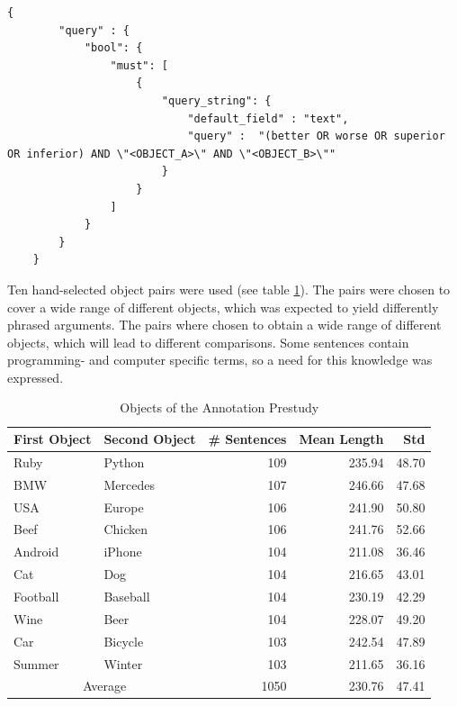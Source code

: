 \begin{lstlisting}[label=lst:es-query-a,breaklines=true,postbreak=\mbox{\textcolor{red}{$\hookrightarrow$}\space}]
  {
        "query" : {
            "bool": {
                "must": [
                    {
                        "query_string": {
                            "default_field" : "text",
                            "query" :  "(better OR worse OR superior OR inferior) AND \"<OBJECT_A>\" AND \"<OBJECT_B>\""
                        }
                    }
                ]
            }
        }
    }
\end{lstlisting}



Ten hand-selected object pairs were used (see table \ref{tbl:prestudy-objects}). The pairs were chosen to cover a wide range of different objects, which was expected to yield differently phrased arguments. The pairs where chosen to obtain a wide range of different objects, which will lead to different comparisons. Some sentences contain programming- and computer specific terms, so a need for this knowledge was expressed.
\begin{table}[h]
\centering
\caption{Objects of the Annotation Prestudy}
\label{tbl:prestudy-objects}
\begin{tabular}{@{}llrrr@{}}
\toprule
First Object & Second Object      & \# Sentences & Mean Length  & Std                             \\ \midrule
Ruby    & Python    & 109    & 235.94 & 48.70 \\
BMW    & Mercedes    & 107 & 246.66 & 47.68\\
USA & Europe & 106 & 241.90 & 50.80\\
Beef & Chicken & 106 & 241.76 & 52.66  \\
Android & iPhone    &   104 & 211.08  & 36.46 \\
Cat & Dog      &     104 & 216.65 & 43.01 \\ 
Football & Baseball   &  104 & 230.19  & 42.29 \\ 
Wine & Beer  & 104 & 228.07 & 49.20 \\
Car & Bicycle & 103 & 242.54 & 47.89\\
Summer & Winter &  103 & 211.65 & 36.16\\  \midrule 
 \multicolumn{2}{c}{Average} & 1050 & 230.76 & 47.41\\ 
\bottomrule  
                               
\end{tabular}
\end{table}

